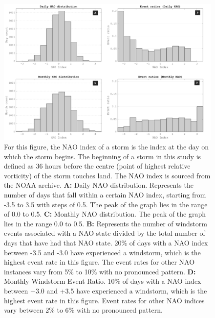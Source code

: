         \begin{figure}
            \centering
            \includegraphics[width=\textwidth]{figures/nao_state_as_four_1.52.png}
            \caption{For this figure, the NAO index of a storm is the index at the day on which the storm begins. The beginning of a storm in this study is defined as 36 hours before the centre (point of highest relative vorticity) of the storm touches land. The NAO index is sourced from the NOAA archive. \textbf{A:} Daily NAO distribution. Represents the number of days that fall within a certain NAO index, starting from -3.5 to 3.5 with steps of 0.5. The peak of the graph lies in the range of 0.0 to 0.5. \textbf{C:} Monthly NAO distribution. The peak of the graph lies in the range 0.0 to 0.5. \textbf{B:} Represents the number of windstorm events associated with a NAO state divided by the total number of days that have had that NAO state. 20\% of days with a NAO index between -3.5 and -3.0 have experienced a windstorm, which is the highest event rate in this figure. The event rates for other NAO instances vary from 5\% to 10\% with no pronounced pattern. \textbf{D:} Monthly Windstorm Event Ratio. 10\% of days with a NAO index between +3.0 and +3.5 have experienced a windstorm, which is the highest event rate in this figure. Event rates for other NAO indices vary between 2\% to 6\% with no pronounced pattern.}
            \label{fig:nao_and_event_rate}
        \end{figure}

